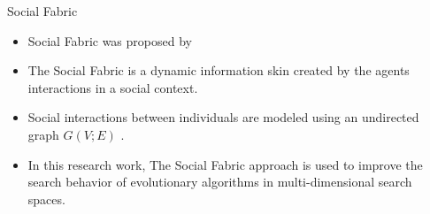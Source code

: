 \documentclass[table]{beamer}
\begin{document}
\begin{frame}{Social Fabric}
	\begin{block}{}
		\begin{itemize}
			\justifying
			\item Social Fabric was proposed by \cite{R:1}
			\newline \item The Social Fabric is a dynamic information skin created by the agents interactions in a social context.
			\newline \item Social interactions between individuals are modeled using an undirected graph $G(V;E)$ \cite{sterling2004aggregation}.
			\newline \item In this research work, The Social Fabric approach is used to improve the search behavior of evolutionary algorithms in multi-dimensional search spaces.
		\end{itemize}
	\end{block}
\end{frame}
	
\end{document}
